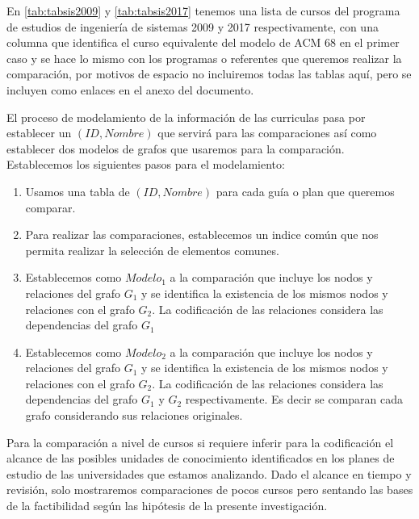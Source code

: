 \newpage

En  \ref{tab:tabsis2009} y \ref{tab:tabsis2017} tenemos una lista de cursos del programa de estudios de ingeniería de sistemas 2009 y 2017 respectivamente, con una columna que identifica el curso equivalente del modelo de ACM 68 en el primer caso y se hace lo mismo con los programas o referentes que queremos realizar la comparación, por motivos de espacio no incluiremos todas las tablas aquí, pero se incluyen como enlaces en el anexo del documento.

El proceso de modelamiento de la información de las curriculas pasa por establecer un $(ID,Nombre)$ que servirá para las comparaciones así como establecer dos modelos de grafos que usaremos para la comparación. Establecemos los siguientes pasos para el modelamiento:

\begin{enumerate}
	\item Usamos una tabla de $(ID,Nombre)$ para cada guía o plan que queremos comparar.

	\item Para realizar las comparaciones, establecemos un indice común que nos permita realizar la selección de elementos comunes.

	\item Establecemos como $Modelo_1$ a la comparación que incluye los nodos y relaciones del grafo $G_1$ y se identifica la existencia de los mismos nodos y relaciones con el grafo $G_2$. La codificación de las relaciones considera las dependencias del grafo $G_1$

	\item Establecemos como $Modelo_2$ a la comparación que incluye los nodos y relaciones del grafo $G_1$ y se identifica la existencia de los mismos nodos y relaciones con el grafo $G_2$. La codificación de las relaciones considera las dependencias del grafo $G_1$ y $G_2$ respectivamente. Es decir se comparan cada grafo considerando sus relaciones originales.

\end{enumerate}

Para la comparación a nivel de cursos si requiere inferir para la codificación el alcance de las posibles unidades de conocimiento identificados en los planes de estudio de las universidades que estamos analizando. Dado el alcance en tiempo y revisión, solo mostraremos comparaciones de pocos cursos pero sentando las bases de la factibilidad según las hipótesis de la presente investigación.



